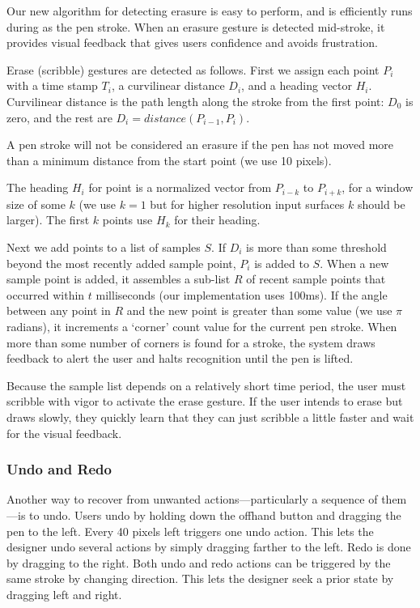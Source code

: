 \documentclass{article}
\begin{document}
Our new algorithm for detecting erasure is easy to perform, and is
efficiently runs during as the pen stroke. When an erasure gesture is
detected mid-stroke, it provides visual feedback that gives users
confidence and avoids frustration.

Erase (scribble) gestures are detected as follows. First we assign
each point $P_i$ with a time stamp $T_i$, a curvilinear distance
$D_i$, and a heading vector $H_i$. Curvilinear distance is the path
length along the stroke from the first point: $D_0$ is zero, and the
rest are $D_i = distance(P_{i-1}, P_i)$.

A pen stroke will not be considered an erasure if the pen has not
moved more than a minimum distance from the start point (we use 10
pixels).

The heading $H_i$ for point is a normalized vector from $P_{i-k}$ to
$P_{i+k}$, for a window size of some $k$ (we use $k=1$ but for higher
resolution input surfaces $k$ should be larger). The first $k$ points
use $H_k$ for their heading.

Next we add points to a list of samples $S$. If $D_i$ is more than
some threshold beyond the most recently added sample point, $P_i$ is
added to $S$. When a new sample point is added, it assembles a
sub-list $R$ of recent sample points that occurred within $t$
milliseconds (our implementation uses 100ms). If the angle between any
point in $R$ and the new point is greater than some value (we use
$\pi$ radians), it increments a `corner' count value for the current
pen stroke. When more than some number of corners is found for a
stroke, the system draws feedback to alert the user and halts
recognition until the pen is lifted.

Because the sample list depends on a relatively short time period, the
user must scribble with vigor to activate the erase gesture. If the
user intends to erase but draws slowly, they quickly learn that they
can just scribble a little faster and wait for the visual feedback.

\subsubsection{Undo and Redo}

Another way to recover from unwanted actions---particularly a sequence
of them---is to undo. Users undo by holding down the offhand button
and dragging the pen to the left. Every 40 pixels left triggers one
undo action. This lets the designer undo several actions by simply
dragging farther to the left. Redo is done by dragging to the
right. Both undo and redo actions can be triggered by the same stroke
by changing direction. This lets the designer seek a prior state by
dragging left and right.
\end{document}

